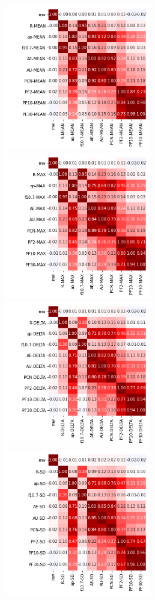 \documentclass[12pt]{article}
\begin{document}
\newpage

\begin{figure}
   \includegraphics[width=0.57\textwidth]{six-seven_mean_3.png}
   \includegraphics[width=0.57\textwidth]{six-seven_max_3.png}
   \includegraphics[width=0.57\textwidth]{six-seven_delta_3.png}
   \includegraphics[width=0.57\textwidth]{six-seven_sd_3.png}
\end{figure}
\end{document}
